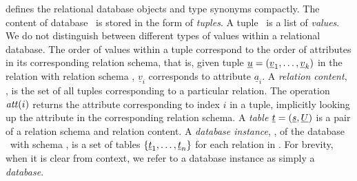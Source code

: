 

 defines the relational database objects and type synonyms compactly.
The content of database \pDB\ is stored in the form of \emph{tuples}. A tuple
\pTuple\ is a list of \emph{values}. We do not distinguish between
different types of values within a relational database.
%
The order of values within a tuple correspond to the order of attributes in its corresponding
relation schema, that is, given tuple $\pTuple = \paran {\vi {\underline v} k}$
in the relation with relation schema \vRel {},
$\underline{v}_i$ corresponds to attribute $\underline{a}_i$.
%
A \emph{relation content}, \pRelCont, is the set of all tuples  corresponding to a particular relation.
%
The operation $\getAtt {i}$ returns the attribute corresponding to index $i$ in
a tuple, implicitly looking up the attribute in the corresponding relation
schema.
%
A \emph{table} \ensuremath{\pTab = \left(\pRelSch, \pRelCont\right)} is a pair
of a relation schema and relation content.
%
A \emph{database instance}, \pInst, of the database \pDB\ with schema \pSch, is
a set of tables $\setDef {\pTab_1, \ldots, \pTab_n}$ for each relation in
\pSch.
For brevity, when it is clear from context, we refer to a database instance as
simply a \emph{database}.




